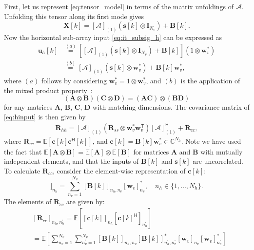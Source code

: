 \documentclass{cta-author}
\newcommand{\mc}[1]{\ensuremath{\mathcal{#1}}}				%
\newcommand{\bmm}[1]{\ensuremath{\mathbb{#1}}}				%
\newcommand{\tran}{\mathsf{T}}						%
\newcommand{\hermit}{\mathsf{H}}					%
\newcommand{\esp}[1]{\ensuremath{\mathbb{E}\left[#1\right]}}		%
\begin{document}
First, let us represent \eqref{eq:tensor_model} in terms of the matrix unfoldings of $\mc{A}$. Unfolding this tensor along its first mode gives \cite{kolda_tensor_2009}
\begin{equation}
	\bm{X}[k] = [\mc{A}]_{(1)} (\bm{s}[k] \otimes \bm{I}_{N_v}) + \bm{B}[k].
\end{equation}
Now the horizontal sub-array input \eqref{eq:it_subsig_h} can be expressed as
\begin{align}
	\bm{u}_h[k] &\stackrel{(a)}{=} \left[[\mc{A}]_{(1)} (\bm{s}[k] \otimes \bm{I}_{N_v}) + \bm{B}[k]\right](1 \otimes \bm{w}_v^*)\\
	                    &\stackrel{(b)}{=} [\mc{A}]_{(1)} (\bm{s}[k] \otimes \bm{w}_v^*) + \bm{B}[k]\bm{w}_v^*, \label{eq:hinput}
\end{align}
where $(a)$ follows by considering $\bm{w}_v^* = 1 \otimes \bm{w}_v^*$,  and $(b)$ is the application of the mixed product property~\cite{liu_hadamard_2008}:
\begin{equation}\label{eq:kronprod}
(\bm{A} \otimes \bm{B})(\bm{C} \otimes \bm{D}) = (\bm{AC}) \otimes (\bm{BD})
\end{equation}
for any matrices $\bm{A}$, $\bm{B}$, $\bm{C}$, $\bm{D}$ with matching dimensions. The covariance matrix of \eqref{eq:hinput} is then given by
\begin{align}
	\bm{R}_{hh} = [\mc{A}]_{(1)} ( \bm{R}_{ss} \otimes \bm{w}_v^* \bm{w}_v^\tran ) [\mc{A}]_{(1)}^\hermit + \bm{R}_{cc}, \label{eq:cov_rh}
\end{align}
where $\bm{R}_{cc} = \esp{ \bm{c}[k] \bm{c}^\hermit[k]  }$, and $\bm{c}[k] = \bm{B}[k]\bm{w}_v^* \in \bmm{C}^{N_h}$. Note we have used the fact that $\esp{\bm{A} \otimes \bm{B}} = \esp{\bm{A}} \otimes \esp{\bm{B}}$ for matrices $\bm{A}$ and $\bm{B}$ with mutually independent elements, and that the inputs of $\bm{B}[k]$ and $\bm{s}[k]$ are uncorrelated. To calculate $\bm{R}_{cc}$, consider the element-wise representation of $\bm{c}[k]$:
\begin{equation}
[\bm{c}[k]]_{n_h} = \sum_{n_v=1}^{N_v} [\bm{B}[k]]_{n_h,n_v} [\bm{w}_v]_{n_v}^*,\quad n_h \in \{1,\ldots,N_h\}.
\end{equation}
The elements of $\bm{R}_{cc}$ are given by:
\begin{align}
&[\bm{R}_{cc}]_{n_h, n_h^\prime} = \esp{ [\bm{c}[k]]_{n_h} [\bm{c}[k]^\hermit]_{n_h^\prime} } \\
&= \esp{ \sum_{n_v=1}^{N_v} \sum_{n_v^\prime=1}^{N_v} \left[ \bm{B}[k] \right]_{n_h, n_v} \left[ \bm{B}[k] \right]_{n_h^\prime, n_v^\prime}^* \left[ \bm{w}_v \right]_{n_v} \left[ \bm{w}_v \right]_{n_v^\prime}^*  } \label{eq:noise_devel}
\end{align}
\end{document}
